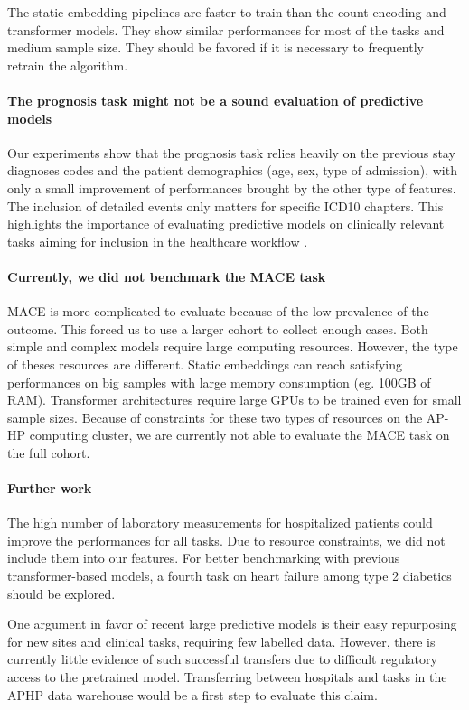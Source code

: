 \documentclass[french,12pt,twoside,a4paper]{book}
\begin{document}
The static embedding pipelines are faster to train than the count encoding and
transformer models. They show similar performances for most of the tasks and
medium sample size. They should be favored if it is necessary to frequently retrain the algorithm.

\paragraph{The prognosis task might not be a sound evaluation of predictive models}
Our experiments show that the prognosis task relies heavily on the previous stay
diagnoses codes and the patient demographics (age, sex, type of admission), with
only a small improvement of performances brought by the other type of features.
The inclusion of detailed events only matters for specific ICD10 chapters. This
highlights the importance of evaluating predictive models on clinically relevant
tasks aiming for inclusion in the healthcare workflow \citep{wornow2023shaky}.

\paragraph{Currently, we did not benchmark the MACE task}

MACE is more complicated to evaluate because of the low prevalence of the
outcome. This forced us to use a larger cohort to collect enough cases. Both
simple and complex models require large computing resources. However, the type
of theses resources are different. Static embeddings can reach satisfying
performances on big samples with large memory consumption (eg. 100GB of RAM).
Transformer architectures require large GPUs to be trained even for small sample
sizes. Because of constraints for these two types of resources on the AP-HP
computing cluster, we are currently not able to evaluate the MACE task on the
full cohort.

\paragraph{Further work} The high number of laboratory measurements for
hospitalized patients could improve the performances for all tasks. Due to
resource constraints, we did not include them into our features. For better
benchmarking with previous transformer-based models, a fourth task on heart
failure among type 2 diabetics should be explored. %

One argument in favor of recent large predictive models is their easy
repurposing for new sites and clinical tasks, requiring few labelled data.
However, there is currently little evidence of such successful transfers due to
difficult regulatory access to the pretrained model. Transferring between
hospitals and tasks in the APHP data warehouse would be a first step to evaluate this
claim.
\end{document}
